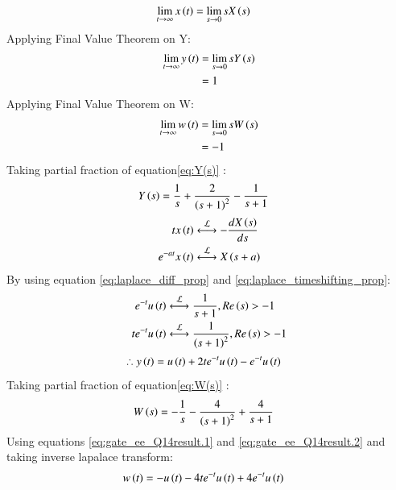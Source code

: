 \documentclass[journal,12pt,twocolumn]{IEEEtran}
\theoremstyle{remark}
\begin{document}
\begin{align}
    \lim_{t \to \infty} x\left(t\right)&= \lim_{s \to 0} sX\left(s\right)\label{eq:gate_ee_Q14.4}
\end{align}
Applying Final Value Theorem on Y:
\begin{align}
     \lim_{t \to \infty} y\left(t\right)&= \lim_{s \to 0} sY\left(s\right)\\
                            &= 1
\end{align}
Applying Final Value Theorem on W:
\begin{align}
     \lim_{t \to \infty} w\left(t\right)&= \lim_{s \to 0} sW\left(s\right)\\
                            &= -1
\end{align}
Taking partial fraction of equation\eqref{eq:Y(s)} :
\begin{align}
    Y\left(s\right) &= \frac{1}{s} + \frac{2}{\left(s+1\right)^2} - \frac{1}{s+1}
\end{align}
\begin{align}
    tx\brak{t} &\system{L} -\frac{d{X\brak{s}}}{ds} \label{eq:laplace_diff_prop}\\
    e^{-at}x\brak{t} &\system{L} X\brak{s+a}\label{eq:laplace_timeshifting_prop}
\end{align}
By using equation \eqref{eq:laplace_diff_prop} and \eqref{eq:laplace_timeshifting_prop}:
\begin{align}
    e^{-t}u\brak{t} &\system{L} \frac{1}{s+1} ,  Re\brak{s}>-1 \label{eq:gate_ee_Q14result.1}\\
    t e^{-t}u\brak{t} &\system{L} \frac{1}{\brak{s+1}^2},  Re\brak{s}>-1 
 \label{eq:gate_ee_Q14result.2}
\end{align}
\begin{align}
    \therefore y\left(t\right) &= u\left(t\right)+ 2t e^{-t}u\left(t\right) - e^{-t}u\left(t\right)
\end{align}
Taking partial fraction of equation\eqref{eq:W(s)} :
\begin{align}
    W\left(s\right) &= -\frac{1}{s} - \frac{4}{\left(s+1\right)^2} + \frac{4}{s+1}
\end{align}
Using equations \eqref{eq:gate_ee_Q14result.1} and \eqref{eq:gate_ee_Q14result.2} and taking inverse lapalace transform:
\begin{align}
    w\left(t\right) &= -u\left(t\right)-4t e^{-t}u\left(t\right) +4 e^{-t}u\left(t\right)
\end{align}
\end{document}
